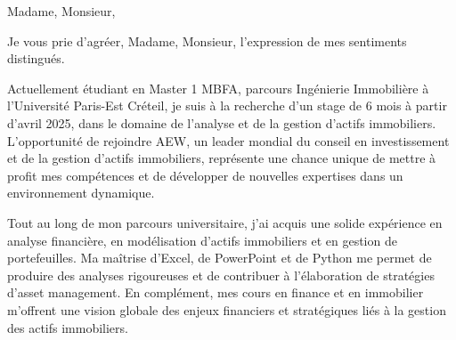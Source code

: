 \documentclass[11pt,a4paper,french]{moderncv}        %
\begin{document}


\date{A Créteil, le \today} 
\opening{Madame, Monsieur,}
\closing{Je vous prie d’agréer, Madame, Monsieur, l’expression de mes sentiments distingués.}
\makelettertitle

\justifying

\hspace*{0.7cm}
Actuellement étudiant en Master 1 MBFA, parcours Ingénierie Immobilière à l’Université Paris-Est Créteil, je suis à la recherche d’un stage de 6 mois à partir d’avril 2025, dans le domaine de l’analyse et de la gestion d’actifs immobiliers. 
L’opportunité de rejoindre AEW, un leader mondial du conseil en investissement et de la gestion d’actifs immobiliers, représente une chance unique de mettre à profit mes compétences et de développer de nouvelles expertises dans un environnement dynamique.

Tout au long de mon parcours universitaire, j’ai acquis une solide expérience en analyse financière, en modélisation d’actifs immobiliers et en gestion de portefeuilles. Ma maîtrise d’Excel, de PowerPoint et de Python me permet de produire des analyses rigoureuses et de contribuer à l’élaboration de stratégies d’asset management. En complément, mes cours en finance et en immobilier m’offrent une vision globale des enjeux financiers et stratégiques liés à la gestion des actifs immobiliers.
\end{document}
